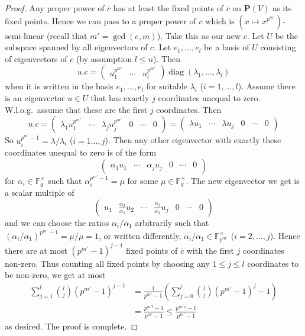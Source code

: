 \documentclass[a4paper,11pt]{amsproc}
\newcommand{\finfield}{\mathbb{F}}%
\DeclareMathOperator{\diag}{diag}%
\newcommand{\proj}{\mathbf P}%
\theoremstyle{plain}
\theoremstyle{definition}
\begin{document}
	\begin{proof}
		Any proper power of $\overline{c}$ has at least the fixed points of $\overline{c}$ on $\proj(V)$ as its fixed points. Hence we can pass to a proper power of $c$ which is $(x\mapsto x^{p^{m'}})$-semi-linear (recall that $m'=\gcd(e,m)$). Take this as our new $c$. Let $U$ be the subspace spanned by all eigenvectors of $c$. Let $e_1,\ldots,e_l$ be a basis of $U$ consisting of eigenvectors of $c$ (by assumption $l\leq n$). Then
		$$
		u.c=\begin{pmatrix}
			u_1^{p^{m'}} & \cdots & u_l^{p^{m'}}
		\end{pmatrix}
		\diag(\lambda_1,\ldots,\lambda_l)
		$$
		when it is written in the basis $e_1,\ldots,e_l$ for suitable $\lambda_i$ ($i=1,\ldots,l$). Assume there is an eigenvector $u\in U$ that has exactly $j$ coordinates unequal to zero. W.l.o.g.\ assume that these are the first $j$ coordinates.
		Then
		$$
		u.c=\begin{pmatrix} 
			\lambda_1 u_1^{p^{m'}} & \cdots & \lambda_j u_j^{p^{m'}} & 0 & \cdots & 0
		\end{pmatrix}
		=
		\begin{pmatrix}
			\lambda u_1 & \cdots & \lambda u_j & 0 & \cdots & 0    
		\end{pmatrix}
		$$
		So $u_i^{p^{m'}-1}=\lambda/\lambda_i$ ($i=1\ldots,j$). Then any other eigenvector with exactly these coordinates unequal to zero is of the form
		$$
		\begin{pmatrix}
			\alpha_1 u_1 & \cdots & \alpha_j u_j & 0 & \cdots & 0
		\end{pmatrix}
		$$
		for $\alpha_i\in\finfield_q^\times$ such that $\alpha_i^{p^{m'}-1}=\mu$ for some $\mu\in\finfield_q^\times$. The new eigenvector we get is a scalar multiple of
		$$
		\begin{pmatrix}
			u_1 & \frac{\alpha_2}{\alpha_1}u_2 & \cdots & \frac{\alpha_j}{\alpha_1} u_j & 0 & \cdots & 0
		\end{pmatrix}
		$$
		and we can choose the ratios $\alpha_i/\alpha_1$ arbitrarily such that $(\alpha_i/\alpha_1)^{p^{m'}-1}=\mu/\mu=1$, or written differently, $\alpha_i/\alpha_1\in\finfield_{p^{m'}}^\times$ ($i=2,\ldots,j$). Hence there are at most $(p^{m'}-1)^{j-1}$ fixed points of $\overline{c}$ with the first $j$ coordinates non-zero. Thus counting all fixed points by choosing any $1\leq j\leq l$ coordinates to be non-zero, we get at most
		\begin{align*}
			\sum_{j=1}^l{\binom{l}{j}\left(p^{m'}-1\right)^{j-1}} 
			& = \frac{1}{p^{m'}-1}\left(\sum_{j=0}^l{\binom{l}{j}\left(p^{m'}-1\right)^j}-1\right)\\
			& =\frac{p^{m' l}-1}{p^{m'}-1}\leq\frac{p^{m' n}-1}{p^{m'}-1}
		\end{align*}
		as desired. The proof is complete.
	\end{proof}
	
\end{document}
